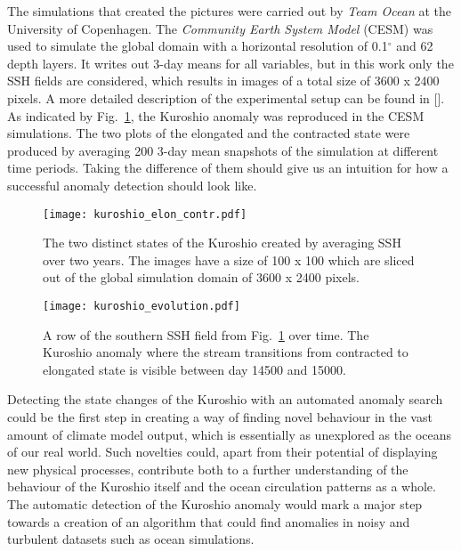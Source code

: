 The simulations that created the pictures were carried out by \emph{Team Ocean}
at the University of Copenhagen. The \emph{Community Earth System Model} (CESM)
was used to simulate the global domain with a horizontal resolution of
0.1$^\circ$ and 62 depth layers. It writes out 3-day means for all variables,
but in this work only the SSH fields are considered, which results in
images of a total size of 3600 x 2400 pixels. A more detailed
description of the experimental setup can be found in [\cite{poulsen2018}].  As
indicated by Fig.~\ref{fig:kuroshio_elon_contr}, the Kuroshio anomaly was
reproduced in the CESM simulations. The two plots of the elongated and the
contracted state were produced by averaging 200 3-day mean snapshots of the
simulation at different time periods. Taking the difference of them should give
us an intuition for how a successful anomaly detection should look like.\\
\begin{figure}
  \centering
  \texttt{[image: kuroshio\_elon\_contr.pdf]}
  \caption{The two distinct states of the Kuroshio created by averaging SSH over
  two years. The images have a size of 100 x 100 which are sliced out of the global
  simulation domain of 3600 x 2400 pixels.}
  \label{fig:kuroshio_elon_contr}
\end{figure}

\begin{figure}
  \centering
  \texttt{[image: kuroshio\_evolution.pdf]}
  \caption{A row of the southern SSH field from
  Fig.~\ref{fig:kuroshio_elon_contr} over time.  The Kuroshio anomaly where
  the stream transitions from contracted to elongated state is visible between
  day 14500 and 15000.
  }
  \label{fig:kuroshio_evolution}
\end{figure}

Detecting the state changes of the Kuroshio with an automated anomaly search
could be the first step in creating a way of finding novel behaviour in the
vast amount of climate model output, which is essentially as unexplored as the
oceans of our real world.  Such novelties could, apart from their potential of
displaying new physical processes, contribute both to a further understanding
of the behaviour of the Kuroshio itself and the ocean circulation patterns as a
whole.  The automatic detection of the Kuroshio anomaly would mark a major step
towards a creation of an algorithm that could find anomalies in noisy and
turbulent datasets such as ocean simulations.
